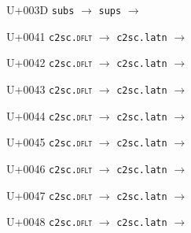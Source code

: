 \documentclass{article}
\begin{document}
\begin{substitutions}
\goodbreak

U+003D  \linebreak
    \texttt{subs} $\to$  \linebreak
    \texttt{sups} $\to$  

\goodbreak

U+0041  \linebreak
    \texttt{c2sc.\textsc{dflt}} $\to$  \linebreak
    \texttt{c2sc.latn} $\to$  

\goodbreak

U+0042  \linebreak
    \texttt{c2sc.\textsc{dflt}} $\to$  \linebreak
    \texttt{c2sc.latn} $\to$  

\goodbreak

U+0043  \linebreak
    \texttt{c2sc.\textsc{dflt}} $\to$  \linebreak
    \texttt{c2sc.latn} $\to$  

\goodbreak

U+0044  \linebreak
    \texttt{c2sc.\textsc{dflt}} $\to$  \linebreak
    \texttt{c2sc.latn} $\to$  

\goodbreak

U+0045  \linebreak
    \texttt{c2sc.\textsc{dflt}} $\to$  \linebreak
    \texttt{c2sc.latn} $\to$  

\goodbreak

U+0046  \linebreak
    \texttt{c2sc.\textsc{dflt}} $\to$  \linebreak
    \texttt{c2sc.latn} $\to$  

\goodbreak

U+0047  \linebreak
    \texttt{c2sc.\textsc{dflt}} $\to$  \linebreak
    \texttt{c2sc.latn} $\to$  

\goodbreak

U+0048  \linebreak
    \texttt{c2sc.\textsc{dflt}} $\to$  \linebreak
    \texttt{c2sc.latn} $\to$  


\end{substitutions}
\end{document}

